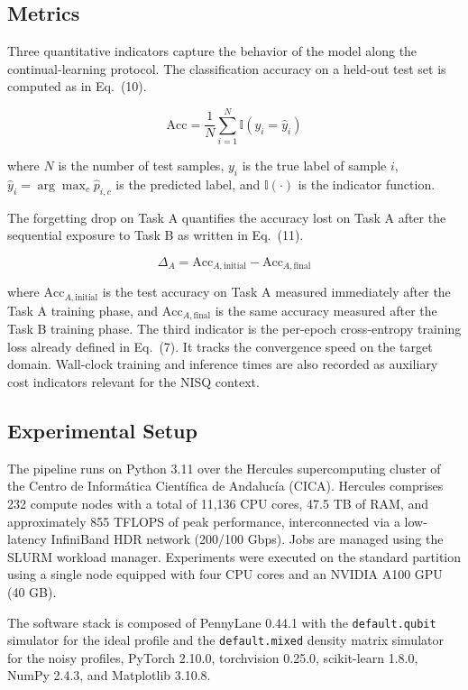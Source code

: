 \documentclass[conference]{IEEEtran}
\begin{document}
\subsection{Metrics}
Three quantitative indicators capture the behavior of the model along the continual-learning protocol. The classification accuracy on a held-out test set is computed as in Eq.~(10).

\begin{equation}
\text{Acc} = \frac{1}{N} \sum_{i=1}^{N} \mathbb{I}(y_i = \hat{y}_i)
\end{equation}

where $N$ is the number of test samples, $y_i$ is the true label of sample $i$, $\hat{y}_i = \arg\max_c \hat{p}_{i,c}$ is the predicted label, and $\mathbb{I}(\cdot)$ is the indicator function.

The forgetting drop on Task A quantifies the accuracy lost on Task A after the sequential exposure to Task B as written in Eq.~(11).

\begin{equation}
\Delta_A = \text{Acc}_{A,\text{initial}} - \text{Acc}_{A,\text{final}}
\end{equation}

where $\text{Acc}_{A,\text{initial}}$ is the test accuracy on Task A measured immediately after the Task A training phase, and $\text{Acc}_{A,\text{final}}$ is the same accuracy measured after the Task B training phase. The third indicator is the per-epoch cross-entropy training loss already defined in Eq.~(7). It tracks the convergence speed on the target domain. Wall-clock training and inference times are also recorded as auxiliary cost indicators relevant for the NISQ context.

\subsection{Experimental Setup}
The pipeline runs on Python 3.11 over the Hercules supercomputing cluster of the Centro de Inform\'atica Cient\'ifica de Andaluc\'ia (CICA). Hercules comprises 232 compute nodes with a total of 11,136 CPU cores, 47.5 TB of RAM, and approximately 855 TFLOPS of peak performance, interconnected via a low-latency InfiniBand HDR network (200/100 Gbps). Jobs are managed using the SLURM workload manager. Experiments were executed on the standard partition using a single node equipped with four CPU cores and an NVIDIA A100 GPU (40 GB).

The software stack is composed of PennyLane 0.44.1 with the \texttt{default.qubit} simulator for the ideal profile and the \texttt{default.mixed} density matrix simulator for the noisy profiles, PyTorch 2.10.0, torchvision 0.25.0, scikit-learn 1.8.0, NumPy 2.4.3, and Matplotlib 3.10.8.
\end{document}
